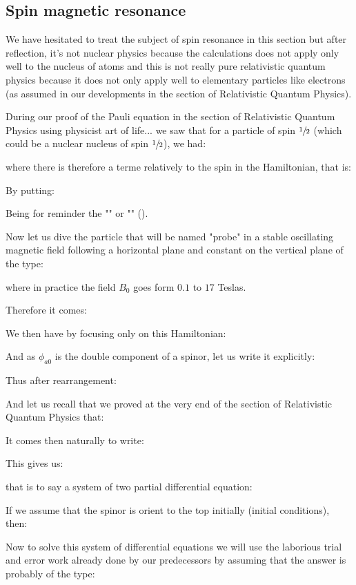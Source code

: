 	\pagebreak
	\subsection{Spin magnetic resonance}
	We have hesitated to treat the subject of spin resonance in this section but after reflection, it's not nuclear physics because the calculations does not apply only well to the nucleus of atoms and this is not really pure relativistic quantum physics because it does not only apply well to elementary particles like electrons (as assumed in our developments in the section  of Relativistic Quantum Physics).

	During our proof of the Pauli equation in the section of Relativistic Quantum Physics using physicist art of life... we saw that for a particle of spin $\sfrac{1}{2}$ (which could be a nuclear nucleus of spin $\sfrac{1}{2}$), we had:
	
	where there is therefore a terme relatively to the spin in the Hamiltonian, that is:
	
	By putting:
	
	Being for reminder the "" or "" ().
	
	Now let us dive the particle that will be named "probe" in a stable oscillating magnetic field following a horizontal plane and constant on the vertical plane of the type:
	
	where in practice the field $B_0$ goes form $0.1$ to $17$ Teslas.

	Therefore it comes:
	
	We then have by focusing only on this Hamiltonian:
	
	And as $\phi_{a0}$ is the double component of a spinor, let us write it explicitly:
	
	Thus after rearrangement:
	
	And let us recall that we proved at the very end of the section of Relativistic Quantum Physics that:
	
	It comes then naturally to write:
	
	This gives us:
	
	that is to say a system of two partial differential equation:
	
	If we assume that the spinor is orient to the top initially (initial conditions), then:
	
	Now to solve this system of differential equations we will use the laborious trial and error work already done by our predecessors by assuming that the answer is probably of the type:
	

